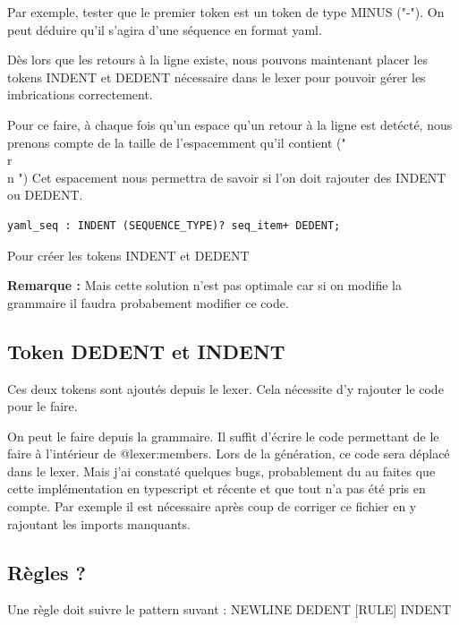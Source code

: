 \documentclass[
    iict, %
    il, %
]{heig-tb}
\begin{document}
Par exemple, tester que le premier token est un token de type MINUS ("-"). On peut déduire qu'il s'agira d'une séquence en format yaml. %

Dès lors que les retours à la ligne existe, nous pouvons maintenant placer les tokens INDENT et DEDENT nécessaire dans le lexer
pour pouvoir gérer les imbrications correctement.

Pour ce faire, à chaque fois qu'un espace qu'un retour à la ligne est detécté, nous prenons compte de la taille de l'espacemment qu'il contient ("\\r\\n    ")
Cet espacement nous permettra de savoir si l'on doit rajouter des INDENT ou DEDENT.


\begin{lstlisting}[frame=single,caption={generator-code},label={generator-code}]
    yaml_seq : INDENT (SEQUENCE_TYPE)? seq_item+ DEDENT;
\end{lstlisting}

Pour créer les tokens INDENT et DEDENT


\textbf{Remarque : } Mais cette solution n'est pas optimale car si on modifie la grammaire il faudra probabement modifier ce code.

\subsection{Token DEDENT et INDENT}
Ces deux tokens sont ajoutés depuis le lexer. Cela nécessite d'y rajouter le code pour le faire.

On peut le faire depuis la grammaire. Il suffit d'écrire le code permettant de le faire à l'intérieur de @lexer:members{}.
Lors de la génération, ce code sera déplacé dans le lexer.
Mais j'ai constaté quelques bugs, probablement du au faites que cette implémentation en typescript et récente et que tout n'a pas été pris en compte.
Par exemple il est nécessaire après coup de corriger ce fichier en y rajoutant les imports manquants.

\subsection{Règles ?}
Une règle doit suivre le pattern suvant : NEWLINE DEDENT [RULE] INDENT
\end{document}
